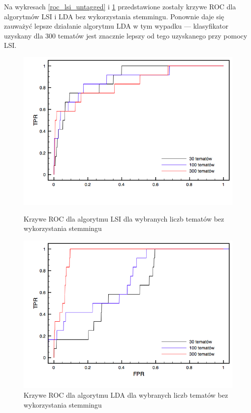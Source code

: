 \documentclass[11pt,a4paper]{article}
\begin{document}
Na wykresach \ref{roc_lsi_untagged} i \ref{roc_lda_untagged} przedstawione
zostały krzywe ROC dla algorytmów LSI i LDA bez wykorzystania stemmingu.
Ponownie daje się zauważyć lepsze działanie algorytmu LDA w tym wypadku ---
klasyfikator uzyskany dla 300 tematów jest znacznie lepszy od tego uzyskanego
przy pomocy LSI.

\begin{figure}[h]
\includegraphics[width=\linewidth]{gfx/lsi_roc_untagged.png}
\caption{Krzywe ROC dla algorytmu LSI dla wybranych liczb tematów bez wykorzystania stemmingu}
\label{roc_lsi_untagged}

\includegraphics[width=\linewidth]{gfx/lda_roc_untagged.png}
\caption{Krzywe ROC dla algorytmu LDA dla wybranych liczb tematów bez wykorzystania stemmingu}
\label{roc_lda_untagged}
\end{figure}
\end{document}
